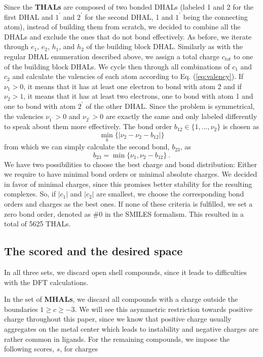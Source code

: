 \documentclass[]{article}
\begin{document}
Since the \textbf{THALs} are composed of two bonded DHALs (labeled 1 and 2 for the first DHAL and $1^\prime$ and $2^\prime$ for the second DHAL, 1 and $1^\prime$ being the connecting atom), instead of building them from scratch, we decided to combine all the DHALs and exclude the ones that do not bond effectively. As before, we iterate through $e_1$, $e_2$, $h_1$, and $h_2$ of the building block DHAL. Similarly as with the regular DHAL enumeration described above, we assign a total charge $c_{tot}$ to one of the building block DHALs. We cycle then through all combinations of $c_1$ and $c_2$ and calculate the valencies of each atom according to Eq. (\ref{eq:valency}). If $\nu_1 > 0$, it means that it has at least one electron to bond with atom 2 and if $\nu_2 > 1$, it means that it has at least two electrons, one to bond with atom 1 and one to bond with atom $2^\prime$ of the other DHAL. Since the problem is symmetrical, the valencies $\nu_{1^\prime} > 0$ and $\nu_{2^\prime} > 0$ are exactly the same and only labeled differently to speak about them more effectively. The bond order $b_{12} \in \{1, ..., \nu_2\}$ is chosen as
\begin{equation}
\min_b\{|\nu_2 - \nu_2 - b_{12}|\}
\end{equation}
from which we can simply calculate the second bond, $b_{23}$, as
\begin{equation}
b_{23} = \min\{\nu_1, \nu_2 - b_{12}\} ~.
\end{equation}
We have two possibilities to choose the best charge and bond distribution: Either we require to have minimal bond orders or minimal absolute charges. We decided in favor of minimal charges, since this promises better stability for the resulting complexes. So, if $|c_1|$ and $|c_2|$ are smallest, we choose the corresponding bond orders and charges as the best ones. If none of these criteria is fulfilled, we set a zero bond order, denoted as $\#0$ in the SMILES formalism. This resulted in a total of 5625 THALs.

\subsection{The scored and the desired space}
In all three sets, we discard open shell compounds, since it leads to difficulties with the DFT calculations.

In the set of \textbf{MHALs}, we discard all compounds with a charge outside the boundaries $1 \geq c \geq -3$. We will see this asymmetric restriction towards positive charge throughout this paper, since we know that positive charge usually aggregates on the metal center which leads to instability and negative charges are rather common in ligands. For the remaining compounds, we impose the following scores, $s$, for charges
\end{document}
